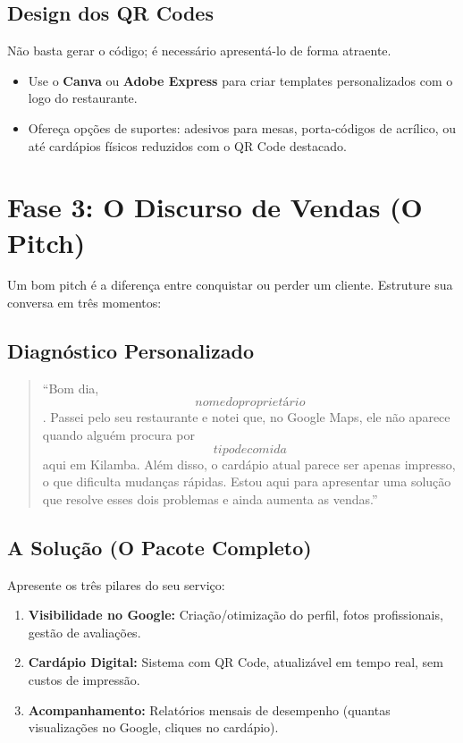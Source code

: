 \documentclass[a4paper,12pt]{article}
\begin{document}
\subsection{Design dos QR Codes}
Não basta gerar o código; é necessário apresentá-lo de forma atraente.
\begin{itemize}
    \item Use o \textbf{Canva} ou \textbf{Adobe Express} para criar templates personalizados com o logo do restaurante.
    \item Ofereça opções de suportes: adesivos para mesas, porta-códigos de acrílico, ou até cardápios físicos reduzidos com o QR Code destacado.
\end{itemize}

\section{Fase 3: O Discurso de Vendas (O Pitch)}
Um bom pitch é a diferença entre conquistar ou perder um cliente. Estruture sua conversa em três momentos:

\subsection{Diagnóstico Personalizado}
\begin{quote}
    “Bom dia, \[nome do proprietário\]. Passei pelo seu restaurante e notei que, no Google Maps, ele não aparece quando alguém procura por \[tipo de comida\] aqui em Kilamba. Além disso, o cardápio atual parece ser apenas impresso, o que dificulta mudanças rápidas. Estou aqui para apresentar uma solução que resolve esses dois problemas e ainda aumenta as vendas.”
\end{quote}

\subsection{A Solução (O Pacote Completo)}
Apresente os três pilares do seu serviço:
\begin{enumerate}
    \item \textbf{Visibilidade no Google:} Criação/otimização do perfil, fotos profissionais, gestão de avaliações.
    \item \textbf{Cardápio Digital:} Sistema com QR Code, atualizável em tempo real, sem custos de impressão.
    \item \textbf{Acompanhamento:} Relatórios mensais de desempenho (quantas visualizações no Google, cliques no cardápio).
\end{enumerate}
\end{document}
